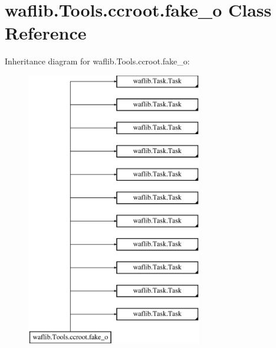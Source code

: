 \hypertarget{classwaflib_1_1_tools_1_1ccroot_1_1fake__o}{}\section{waflib.\+Tools.\+ccroot.\+fake\+\_\+o Class Reference}
\label{classwaflib_1_1_tools_1_1ccroot_1_1fake__o}
Inheritance diagram for waflib.\+Tools.\+ccroot.\+fake\+\_\+o\+:\begin{figure}[H]
\begin{center}
\leavevmode
\includegraphics[height=12.000000cm]{classwaflib_1_1_tools_1_1ccroot_1_1fake__o}
\end{center}
\end{figure}
